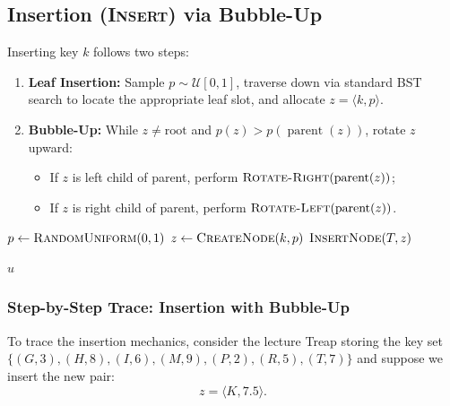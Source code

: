 \subsection{Insertion (\textsc{Insert}) via Bubble-Up}
Inserting key $k$ follows two steps:
\begin{enumerate}
    \item \textbf{Leaf Insertion:} Sample $p \sim \mathcal{U}[0, 1]$, traverse down via standard BST search to locate the appropriate leaf slot, and allocate $z = \langle k, p \rangle$.
    \item \textbf{Bubble-Up:} While $z \neq \text{root}$ and $p(z) > p(\operatorname{parent}(z))$, rotate $z$ upward:
    \begin{itemize}
        \item If $z$ is left child of parent, perform $\textsc{Rotate-Right}(\operatorname{parent}(z))$;
        \item If $z$ is right child of parent, perform $\textsc{Rotate-Left}(\operatorname{parent}(z))$.
    \end{itemize}
\end{enumerate}

\begin{algorithm}[H]
\caption{Treap Insertion ($\textsc{Insert}(T, k)$)}
\label{alg:treap-insert-en}
\BlankLine
$p \leftarrow \textsc{RandomUniform}(0, 1)$\;
$z \leftarrow \textsc{CreateNode}(k, p)$\;
\Return $\textsc{InsertNode}(T, z)$\;
\end{algorithm}

\begin{algorithm}[H]
\caption{Recursive Insertion with Bubble-Up Rotations ($\textsc{InsertNode}(u, z)$)}
\label{alg:treap-insert-node-en}
\BlankLine
{}
\Return $u$\;
\end{algorithm}

\subsubsection{Step-by-Step Trace: Insertion with Bubble-Up}
To trace the insertion mechanics, consider the lecture Treap storing the key set $\{ (G, 3), (H, 8), (I, 6), (M, 9), (P, 2), (R, 5), (T, 7) \}$ and suppose we insert the new pair:
\begin{equation}
  z = \langle K, 7.5 \rangle.
\end{equation}

